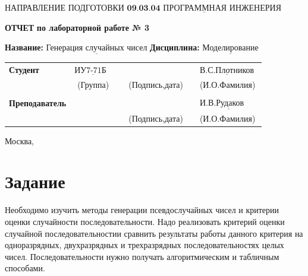\documentclass[12pt,a4paper,oneside]{report}
\begin{document}
\noindent НАПРАВЛЕНИЕ ПОДГОТОВКИ $\underline{\textbf{09.03.04 ПРОГРАММНАЯ ИНЖЕНЕРИЯ}}$\newline\newline\newline\newline\newline\newline\newline
\begin{center}
    \begin{flushright}
    \Large\textbf{ОТЧЕТ}\newline
	\Large\textbf{по лабораторной работе № 3}\newline
	\end{flushright}
\end{center}
\noindent\textbf{Название:} $\underline{\text{Генерация случайных чисел}}$\newline\newline
\noindent\textbf{Дисциплина:} $\underline{\text{Моделирование}}$\newline\newline\newline\newline\newline\newline\newline\newline
\begin{tabular}{lcp{5em}lp{2em}l}
	\noindent\textbf{Студент} &  $\underline{\text{ИУ7-71Б~~}}$ &             &\hspace{1cm} & & $\underline{\text{В.С.Плотников}}$ \\\cline{4-3}
	 & (Группа) & &(Подпись,дата)  & & (И.О.Фамилия) \\
	 & & & & &\\
	\noindent\textbf{Преподаватель} &  & &\hspace{1cm} & &$\underline{\text{И.В.Рудаков ~~~~}}$ \\\cline{4-3} 
	 &  & & (Подпись,дата)  & &(И.О.Фамилия) \\
    \end{tabular}
\begin{center}
	\vfill
	Москва, \the\year
\end{center}
\clearpage



\section*{Задание}
\quad Необходимо изучить методы генерации псевдослучайных чисел и критерии оценки случайности последовательности. Надо реализовать критерий оценки случайной последовательностии сравнить результаты работы данного критерия на одноразрядных, двухразрядных и трехразрядных последовательностях целых чисел. Последовательности нужно получать алгоритмическим и табличным способами.
\end{document}

